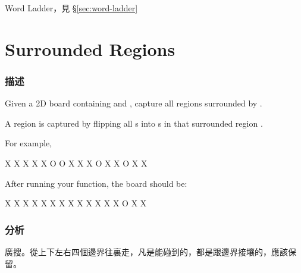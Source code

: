 \begindot
\item Word Ladder，見 \S \ref{sec:word-ladder}
\myenddot


\section{Surrounded Regions} %
\label{sec:surrounded-regions}


\subsubsection{描述}
Given a 2D board containing  and , capture all regions surrounded by .

A region is captured by flipping all s into s in that surrounded region .

For example,
\begin{Code}
X X X X
X O O X
X X O X
X O X X
\end{Code}

After running your function, the board should be:
\begin{Code}
X X X X
X X X X
X X X X
X O X X
\end{Code}


\subsubsection{分析}
廣搜。從上下左右四個邊界往裏走，凡是能碰到的，都是跟邊界接壤的，應該保留。


